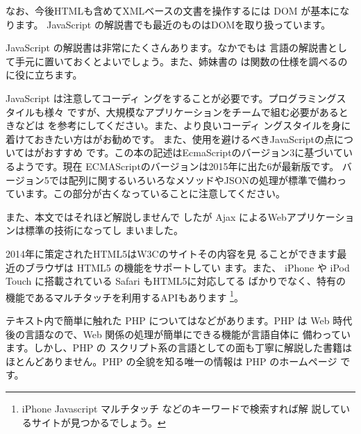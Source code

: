 なお、今後HTMLも含めてXMLベースの文書を操作するには DOM が基本になります。
JavaScript の解説書でも最近のものはDOMを取り扱っています。

JavaScript の解説書は非常にたくさんあります。なかでも\cite{JavaScript}は
言語の解説書として手元に置いておくとよいでしょう。また、姉妹書の
\cite{JavaScriptRef} は関数の仕様を調べるのに役に立ちます。

JavaScript は注意してコーディ
ングをすることが必要です。プログラミングスタイルも様々
ですが、大規模なアプリケーションをチームで組む必要があるときなどは
\cite{JavaScriptMentenable}を参考にしてください。また、より良いコーディ
ングスタイルを身に着けておきたい方は\cite{JavaScript68}がお勧めです。
また、使用を避けるべきJavaScriptの点については\cite{Crockford}がおすすめ
です。この本の記述はEcmaScriptのバージョン3に基づいているようです。現在
ECMAScriptのバージョンは2015年に出た6が最新版です\cite{ECMAScript2015}。
バージョン5では配列に関するいろいろなメソッドやJSONの処理が標準で備わっ
ています。この部分が古くなっていることに注意してください。

また、本文ではそれほど解説しませんで
したが Ajax によるWebアプリケーションは標準の技術になってし
まいました。

2014年に策定されたHTML5はW3Cのサイト\cite{HTML5}その内容を見
ることができます最近のブラウザは HTML5 の機能をサポートしてい
ます。また、
iPhone や iPod Touch に搭載されている Safari もHTML5に対応してる
ばかりでなく、特有の機能であるマルチタッチを利用するAPIもあります
\footnote{iPhone Javascript マルチタッチ などのキーワードで検索すれば解
説しているサイトが見つかるでしょう。}。

テキスト内で簡単に触れた PHP については\cite{learningphp,ProgPHP}などがあります。PHP
 は Web 時代後の言語なので、Web 関係の処理が簡単にできる機能が言語自体に
 備わっています。しかし、PHP の%
 スクリプト系の言語としての面も丁寧に解説した書籍はほとんどありません。PHP
 の全貌を知る唯一の情報は PHP のホームページ\cite{PHPHome} です。

